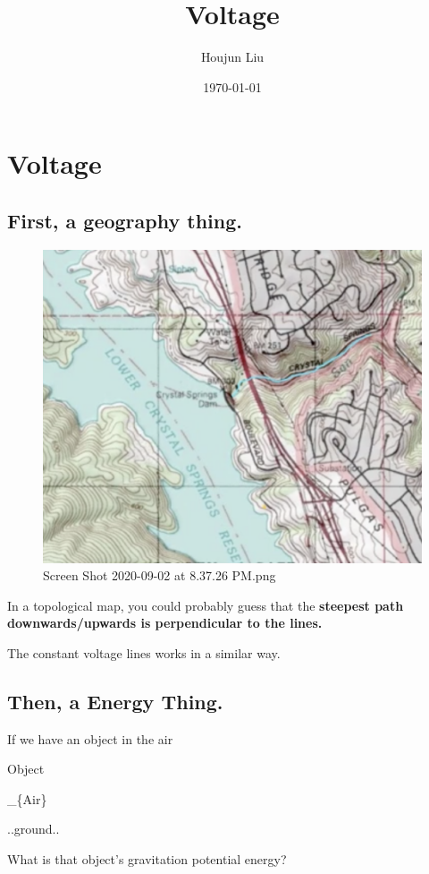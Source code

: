 \documentclass[letterpaper]{article}
\author{Houjun Liu}
\date{\today}
\title{Voltage}
\renewcommand\maketitle{}
\begin{document}
\maketitle


\section{Voltage}
\label{sec:orgfdb888c}
\subsection{First, a geography thing.}
\label{sec:org2eaf833}
\begin{figure}[htbp]
\centering
\includegraphics[width=.9\linewidth]{./Screen Shot 2020-09-02 at 8.37.26 PM.png}
\caption{Screen Shot 2020-09-02 at 8.37.26 PM.png}
\end{figure}

In a topological map, you could probably guess that the \textbf{steepest path
downwards/upwards is perpendicular to the lines.}

The constant voltage lines works in a similar way.

\subsection{Then, a Energy Thing.}
\label{sec:org89f1dd2}
If we have an object in the air

Object

\_\{Air\}

..ground..

What is that object's gravitation potential energy?
\end{document}
